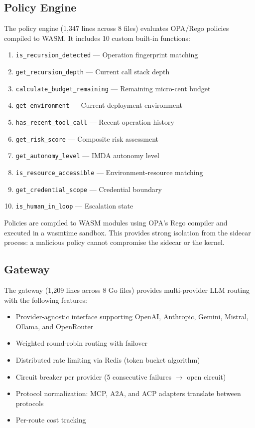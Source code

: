 \documentclass[runningheads]{llncs}
\begin{document}
\subsection{Policy Engine}

The policy engine (1,347 lines across 8 files) evaluates OPA/Rego policies compiled to WASM. It includes 10 custom built-in functions:

\begin{enumerate}
\item \texttt{is\_recursion\_detected} — Operation fingerprint matching
\item \texttt{get\_recursion\_depth} — Current call stack depth
\item \texttt{calculate\_budget\_remaining} — Remaining micro-cent budget
\item \texttt{get\_environment} — Current deployment environment
\item \texttt{has\_recent\_tool\_call} — Recent operation history
\item \texttt{get\_risk\_score} — Composite risk assessment
\item \texttt{get\_autonomy\_level} — IMDA autonomy level
\item \texttt{is\_resource\_accessible} — Environment-resource matching
\item \texttt{get\_credential\_scope} — Credential boundary
\item \texttt{is\_human\_in\_loop} — Escalation state
\end{enumerate}

Policies are compiled to WASM modules using OPA's Rego compiler and executed in a wasmtime sandbox. This provides strong isolation from the sidecar process: a malicious policy cannot compromise the sidecar or the kernel.

\subsection{Gateway}

The gateway (1,209 lines across 8 Go files) provides multi-provider LLM routing with the following features:
\begin{itemize}
\item Provider-agnostic interface supporting OpenAI, Anthropic, Gemini, Mistral, Ollama, and OpenRouter
\item Weighted round-robin routing with failover
\item Distributed rate limiting via Redis (token bucket algorithm)
\item Circuit breaker per provider (5 consecutive failures $\to$ open circuit)
\item Protocol normalization: MCP, A2A, and ACP adapters translate between protocols
\item Per-route cost tracking
\end{itemize}
\end{document}
